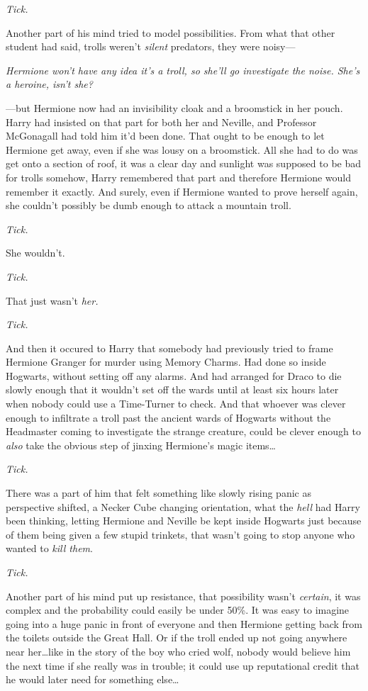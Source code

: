 \emph{Tick.}

Another part of his mind tried to model possibilities. From what that other
student had said, trolls weren’t \emph{silent} predators, they were noisy—

\emph{Hermione won’t have any idea it’s a troll, so she’ll go investigate the
noise. She’s a heroine, isn’t she?}

—but Hermione now had an invisibility cloak and a broomstick in her pouch.
Harry had insisted on that part for both her and Neville, and Professor
McGonagall had told him it’d been done. That ought to be enough to let Hermione
get away, even if she was lousy on a broomstick. All she had to do was get onto
a section of roof, it was a clear day and sunlight was supposed to be bad for
trolls somehow, Harry remembered that part and therefore Hermione would
remember it exactly. And surely, even if Hermione wanted to prove herself
again, she couldn’t possibly be dumb enough to attack a mountain troll.

\emph{Tick.}

She wouldn’t.

\emph{Tick.}

That just wasn’t \emph{her.}

\emph{Tick.}

And then it occured to Harry that somebody had previously tried to frame
Hermione Granger for murder using Memory Charms. Had done so inside Hogwarts,
without setting off any alarms. And had arranged for Draco to die slowly enough
that it wouldn’t set off the wards until at least six hours later when nobody
could use a Time-Turner to check. And that whoever was clever enough to
infiltrate a troll past the ancient wards of Hogwarts without the Headmaster
coming to investigate the strange creature, could be clever enough to
\emph{also} take the obvious step of jinxing Hermione’s magic items…

\emph{Tick.}

There was a part of him that felt something like slowly rising panic as
perspective shifted, a Necker Cube changing orientation, what the \emph{hell}
had Harry been thinking, letting Hermione and Neville be kept inside Hogwarts
just because of them being given a few stupid trinkets, that wasn’t going to
stop anyone who wanted to \emph{kill them}.

\emph{Tick.}

Another part of his mind put up resistance, that possibility wasn’t
\emph{certain}, it was complex and the probability could easily be under 50\%.
It was easy to imagine going into a huge panic in front of everyone and then
Hermione getting back from the toilets outside the Great Hall. Or if the
troll ended up not going anywhere near her…like in the story of the boy
who cried wolf, nobody would believe him the next time if she really was in
trouble; it could use up reputational credit that he would later need for
something else…

